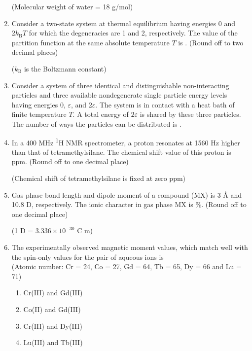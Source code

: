 \documentclass[12pt]{article}
\begin{document}
\begin{enumerate}[label=Q.\arabic*]
	\begin{flushleft}
(Molecular weight of water = 18 g/mol)
	\end{flushleft}

\item Consider a two-state system at thermal equilibrium having energies 0 and $2k_\mathrm{B}T$ for which the degeneracies are 1 and 2, respectively. The value of the partition function at the same absolute temperature $T$ is \underline{\hspace{2cm}}. (Round off to two decimal places)

	\begin{flushleft}
($k_\mathrm{B}$ is the Boltzmann constant)
	\end{flushleft}

	\item Consider a system of three identical and distinguishable non-interacting particles and three available nondegenerate single particle energy levels having energies 0, $\varepsilon$, and $2\varepsilon$. The system is in contact with a heat bath of finite temperature $T$. A total energy of $2\varepsilon$ is shared by these three particles. The number of ways the particles can be distributed is \underline{\hspace{2cm}}.

\item In a 400 MHz \textsuperscript{1}H NMR spectrometer, a proton resonates at 1560 Hz higher than that of tetramethylsilane. The chemical shift value of this proton is \underline{\hspace{2cm}} ppm. (Round off to one decimal place)

	\begin{flushleft}
(Chemical shift of tetramethylsilane is fixed at zero ppm)
	\end{flushleft}

\item Gas phase bond length and dipole moment of a compound (MX) is 3 Å and 10.8 D, respectively. The ionic character in gas phase MX is \underline{\hspace{2cm}} \%. (Round off to one decimal place)

	\begin{flushleft}
(1 D = $3.336 \times 10^{-30}$ C m)

	\end{flushleft}
	\item The experimentally observed magnetic moment values, which match well with the spin-only values for the pair of aqueous ions is \\
		(Atomic number: Cr = 24, Co = 27, Gd = 64, Tb = 65, Dy = 66 and Lu = 71)  
		\begin{enumerate}
	\item Cr(III) and Gd(III)
	\item Co(II) and Gd(III)
	\item Cr(III) and Dy(III)
\item Lu(III) and Tb(III)
	\end{enumerate}


\end{enumerate}
\end{document}
